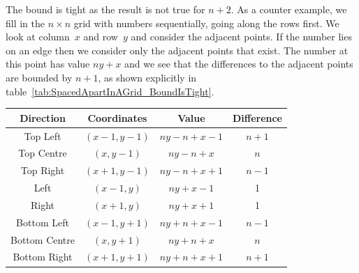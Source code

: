 \begin{parts}
\begin{solution}
		The bound is tight as the result is not true for $n + 2$. As a counter example, we fill in the $n \times n$ grid with numbers sequentially, going along the rows first. We look at column~$x$ and row~$y$ and consider the adjacent points. If the number lies on an edge then we consider only the adjacent points that exist. The number at this point has value $ny + x$ and we see that the differences to the adjacent points are bounded by $n + 1$, as shown explicitly in table~\ref{tab:SpacedApartInAGrid_BoundIsTight}.
		
		\begin{minipage}{\linewidth}
			\centering
			\label{tab:SpacedApartInAGrid_BoundIsTight}
			\begin{tabular}{cccc}
				\toprule
				Direction & Coordinates & Value & Difference  \\
				\midrule
				Top Left & $(x-1, y-1)$ & $ny - n + x - 1$ & $n + 1$  \\
				Top Centre & $(x, y-1)$ & $ny - n + x$ & $n$  \\
				Top Right & $(x+1, y-1)$ & $ny - n + x + 1$ & $n - 1$  \\
				Left & $(x-1, y)$ & $ny + x - 1$ & 1  \\
				Right & $(x+1, y)$ & $ny + x + 1$ & 1  \\
				Bottom Left & $(x-1, y+1)$ & $ny + n + x - 1$ & $n - 1$  \\
				Bottom Centre & $(x, y+1)$ & $ny + n + x$ & $n$  \\
				Bottom Right & $(x+1, y+1)$ & $ny + n + x + 1$ & $n + 1$  \\
				\bottomrule
			\end{tabular}
		\end{minipage}
	
	\end{solution}

\end{parts}
